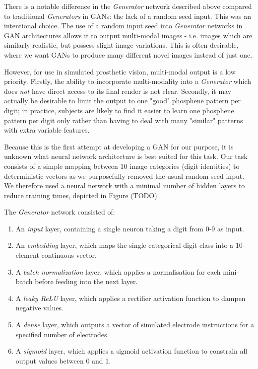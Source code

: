 \documentclass[a4paper,11pt,openany]{book}
\begin{document}
There is a notable difference in the \emph{Generator} network described above compared to traditional \emph{Generators} in GANs: the lack of a random seed input.
This was an intentional choice.
The use of a random input seed into \emph{Generator} networks in GAN architectures allows it to output multi-modal images - i.e. images which are similarly realistic, but possess slight image variations.
This is often desirable, where we want GANs to produce many different novel images instead of just one.

However, for use in simulated prosthetic vision, multi-modal output is a low priority.
Firstly, the ability to incorporate multi-modality into a \emph{Generator} which does \emph{not} have direct access to its final render is not clear.
Secondly, it may actually be desirable to limit the output to one "good" phosphene pattern per digit; in practice, subjects are likely to find it easier to learn one phosphene pattern per digit only rather than having to deal with many "similar" patterns with extra variable features.

Because this is the first attempt at developing a GAN for our purpose, it is unknown what neural network architecture is best suited for this task.
Our task consists of a simple mapping between 10 image categories (digit identities) to deterministic vectors as we purposefully removed the usual random seed input.
We therefore used a neural network with a minimal number of hidden layers to reduce training times, depicted in Figure (TODO).

The \emph{Generator} network consisted of:
\begin{enumerate}
\item An \emph{input} layer, containing a single neuron taking a digit from 0-9 as input.
\item An \emph{embedding} layer, which maps the single categorical digit class into a 10-element continuous vector.
\item A \emph{batch normalization} layer, which applies a normalisation for each mini-batch before feeding into the next layer.
\item A \emph{leaky ReLU} layer, which applies a rectifier activation function to dampen negative values.
\item A \emph{dense} layer, which outputs a vector of simulated electrode instructions for a specified number of electrodes.
\item A \emph{sigmoid} layer, which applies a sigmoid activation function to constrain all output values between 0 and 1.
\end{enumerate}
\end{document}
